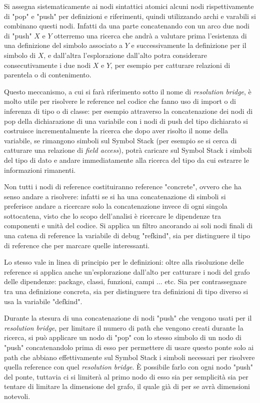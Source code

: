 \par
Si assegna sistematicamente ai nodi sintattici atomici alcuni nodi rispettivamente di "pop" e "push" per definizioni e riferimenti, quindi utilizzando archi e varabili si combinano questi nodi.
Infatti da una parte concatenando con un arco due nodi di "push" $X$ e $Y$ otterremo una ricerca che andr\`a a valutare prima l'esistenza di una definizione del simbolo associato a $Y$ e successivamente la definizione per il simbolo di $X$, e dall'altra l'esplorazione dall'alto potra considerare consecutivamente i due nodi $X$ e $Y$, per esempio per catturare relazioni di parentela o di contenimento.

\par
Questo meccanismo, a cui si far\`a riferimento sotto il nome di \emph{resolution bridge}, \`e molto utile per risolvere le reference nel codice che fanno uso di import o di inferenza di tipo o di classe: per esempio attraverso la concatenazione dei nodi di pop della dichiarazione di una variabile con i nodi di push del tipo dichiarato si costruisce incrementalmente la ricerca che dopo aver risolto il nome della variabile, se rimangono simboli sul Symbol Stack (per esempio se si cerca di catturare una relazione di \emph{field access}), potr\`a caricare sul Symbol Stack i simboli del tipo di dato e andare immediatamente alla ricerca del tipo da cui estrarre le informazioni rimanenti.

\par
Non tutti i nodi di reference costituiranno reference "concrete", ovvero che ha senso andare a risolvere: infatti se si ha una concatenazione di simboli si preferisce andare a ricercare solo la concatenazione invece di ogni singola sottocatena, visto che lo scopo dell'analisi \`e ricercare le dipendenze tra componenti e unit\`a del codice. Si applica un filtro ancorando ai soli nodi finali di una catena di reference la variabile di debug "refkind", sia per distinguere il tipo di reference che per marcare quelle interessanti.

\par
Lo stesso vale in linea di principio per le definizioni: oltre alla risoluzione delle reference si applica anche un'esplorazione dall'alto per catturare i nodi del grafo delle dipendenze: package, classi, funzioni, campi ... etc. Sia per contrassegnare tra una definizione concreta, sia per distinguere tra definizioni di tipo diverso si usa la variabile "defkind".

\par
Durante la stesura di una concatenazione di nodi "push" che vengono usati per il \emph{resolution bridge}, per limitare il numero di path che vengono creati durante la ricerca, si pu\`o applicare un nodo di "pop" con lo stesso simbolo di un nodo di "push" concatenandolo prima di esso per permettere di usare questo ponte solo ai path che abbiano effettivamente sul Symbol Stack i simboli necessari per risolvere quella reference con quel \emph{resolution bridge}.
\`E possibile farlo con ogni nodo "push" del ponte, tuttavia ci si limiter\`a al primo nodo di esso sia per semplicit\`a sia per tentare di limitare la dimensione del grafo, il quale gi\`a di per se avr\`a dimensioni notevoli.

